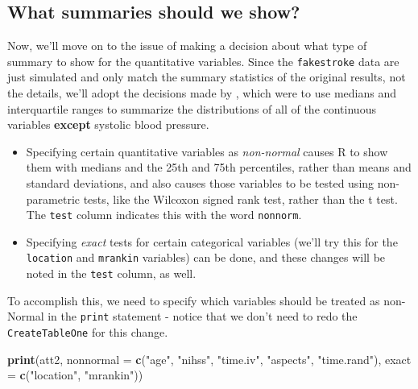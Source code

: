 \documentclass[]{book}
\newenvironment{Shaded}{\begin{snugshade}}{\end{snugshade}}
\newcommand{\KeywordTok}[1]{\textcolor[rgb]{0.13,0.29,0.53}{\textbf{#1}}}
\newcommand{\DataTypeTok}[1]{\textcolor[rgb]{0.13,0.29,0.53}{#1}}
\newcommand{\StringTok}[1]{\textcolor[rgb]{0.31,0.60,0.02}{#1}}
\newcommand{\NormalTok}[1]{#1}
\providecommand{\tightlist}{%
  \setlength{\itemsep}{0pt}\setlength{\parskip}{0pt}}
\theoremstyle{definition}
\theoremstyle{definition}
\theoremstyle{definition}
\theoremstyle{remark}
\begin{document}
\subsection{What summaries should we
show?}\label{what-summaries-should-we-show}

Now, we'll move on to the issue of making a decision about what type of
summary to show for the quantitative variables. Since the
\texttt{fakestroke} data are just simulated and only match the summary
statistics of the original results, not the details, we'll adopt the
decisions made by \citet{Berkhemer2015}, which were to use medians and
interquartile ranges to summarize the distributions of all of the
continuous variables \textbf{except} systolic blood pressure.

\begin{itemize}
\tightlist
\item
  Specifying certain quantitative variables as \emph{non-normal} causes
  R to show them with medians and the 25th and 75th percentiles, rather
  than means and standard deviations, and also causes those variables to
  be tested using non-parametric tests, like the Wilcoxon signed rank
  test, rather than the t test. The \texttt{test} column indicates this
  with the word \texttt{nonnorm}.
\item
  Specifying \emph{exact} tests for certain categorical variables (we'll
  try this for the \texttt{location} and \texttt{mrankin} variables) can
  be done, and these changes will be noted in the \texttt{test} column,
  as well.
\end{itemize}

To accomplish this, we need to specify which variables should be treated
as non-Normal in the \texttt{print} statement - notice that we don't
need to redo the \texttt{CreateTableOne} for this change.

\begin{Shaded}
\begin{Highlighting}[]
\KeywordTok{print}\NormalTok{(att2, }
      \DataTypeTok{nonnormal =} \KeywordTok{c}\NormalTok{(}\StringTok{"age"}\NormalTok{, }\StringTok{"nihss"}\NormalTok{, }\StringTok{"time.iv"}\NormalTok{, }\StringTok{"aspects"}\NormalTok{, }\StringTok{"time.rand"}\NormalTok{),}
      \DataTypeTok{exact =} \KeywordTok{c}\NormalTok{(}\StringTok{"location"}\NormalTok{, }\StringTok{"mrankin"}\NormalTok{))}
\end{Highlighting}
\end{Shaded}
\end{document}

